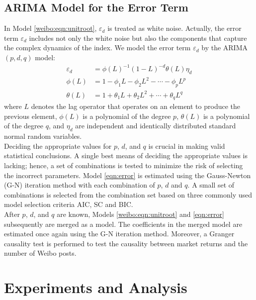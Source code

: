 \documentclass[review,3p,times,12pt,number]{elsarticle}
\begin{document}
\subsection{ARIMA Model for the Error Term}
In Model \ref{weibo:eqn:unitroot}, $\varepsilon_d$ is treated as white noise. Actually, the error term $\varepsilon_d$ includes not only the white noise but also the components that capture the complex dynamics of the index. We model the error term $\varepsilon_d$ by the ARIMA$(p, d, q)$ model:
\begin{eqnarray}
\label{eqn:error}
	\nonumber \varepsilon_d &= \phi(L)^{-1}(1-L)^{-d}\theta(L)\eta_d  \\
	\phi(L)       &= 1-\phi_1 L - \phi_2 L^2 - \cdots - \phi_p L^p \\
	\nonumber \theta(L)     &= 1+\theta_1 L + \theta_2 L^2 + \cdots + \theta_q L^q
\end{eqnarray}
where $L$ denotes the lag operator that operates on an element to produce the previous element, $\phi(L)$ is a polynomial of the degree $p$, $\theta(L)$ is a polynomial of the degree $q$, and $\eta_d$ are independent and identically distributed standard normal random variables.\\
\indent
Deciding the appropriate values for $p$, $d$, and $q$ is crucial in making valid statistical conclusions. A single best means of deciding the appropriate values is lacking; hence, a set of combinations is tested to minimize the risk of selecting the incorrect parameters. Model \ref{eqn:error} is estimated using the Gauss-Newton (G-N) iteration method with each combination of $p$, $d$ and $q$.
A small set of combinations is selected from the combination set based on three commonly used model selection criteria AIC, SC and BIC.\\
\indent
After $p$, $d$, and $q$ are known, Models \ref{weibo:eqn:unitroot} and \ref{eqn:error} subsequently are merged as a model. The coefficients in the merged model are estimated once again using the G-N iteration method.
Moreover, a Granger causality test is performed to test the causality between market returns and the number of Weibo posts.


\section{Experiments and Analysis}
\label{sec:weibo:ea}
\end{document}
